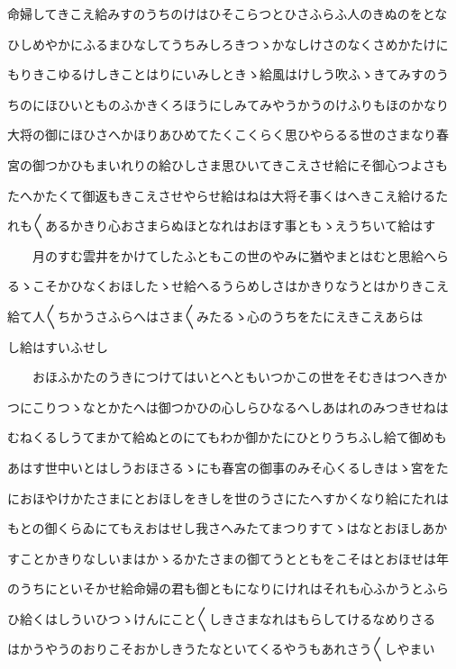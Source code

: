 \documentclass[a4paper,11pt,landscape]{ltjtarticle}
\begin{document}
\par\medskip
命婦してきこえ給みすのうちのけはひそこらつとひさふらふ人のきぬのをとな
\par\medskip
ひしめやかにふるまひなしてうちみしろきつゝかなしけさのなくさめかたけに
\par\medskip
もりきこゆるけしきことはりにいみしときゝ給風はけしう吹ふゝきてみすのう
\par\medskip
ちのにほひいとものふかきくろほうにしみてみやうかうのけふりもほのかなり
\par\medskip
大将の御にほひさへかほりあひめてたくこくらく思ひやらるる世のさまなり春
\par\medskip
宮の御つかひもまいれりの給ひしさま思ひいてきこえさせ給にそ御心つよさも
\par\medskip
たへかたくて御返もきこえさせやらせ給はねは大将そ事くはへきこえ給けるた
\par\medskip
れも〱あるかきり心おさまらぬほとなれはおほす事ともゝえうちいて給はす
\par\medskip
　　月のすむ雲井をかけてしたふともこの世のやみに猶やまとはむと思給へら
\par\medskip
るゝこそかひなくおほしたゝせ給へるうらめしさはかきりなうとはかりきこえ
\par\medskip
給て人〱ちかうさふらへはさま〱みたるゝ心のうちをたにえきこえあらは
\par\medskip
し給はすいふせし
\par\medskip
　　おほふかたのうきにつけてはいとへともいつかこの世をそむきはつへきか
\par\medskip
つにこりつゝなとかたへは御つかひの心しらひなるへしあはれのみつきせねは
\par\medskip
むねくるしうてまかて給ぬとのにてもわか御かたにひとりうちふし給て御めも
\par\medskip
あはす世中いとはしうおほさるゝにも春宮の御事のみそ心くるしきはゝ宮をた
\par\medskip
におほやけかたさまにとおほしをきしを世のうさにたへすかくなり給にたれは
\par\medskip
もとの御くらゐにてもえおはせし我さへみたてまつりすてゝはなとおほしあか
\par\medskip
すことかきりなしいまはかゝるかたさまの御てうとともをこそはとおほせは年
\par\medskip
のうちにといそかせ給命婦の君も御ともになりにけれはそれも心ふかうとふら
\par\medskip
ひ給くはしういひつゝけんにこと〱しきさまなれはもらしてけるなめりさる
\par\medskip
はかうやうのおりこそおかしきうたなといてくるやうもあれさう〱しやまい
\end{document}
